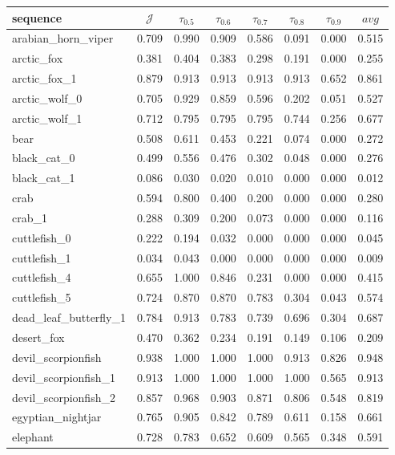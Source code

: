 \begin{table*}[]
\begin{tabular}{l|c|cccccc}
sequence & $\mathcal{J}$ & $\tau_{0.5}$ & $\tau_{0.6}$ & $\tau_{0.7}$ & $\tau_{0.8}$ & $\tau_{0.9}$ & $avg$ \\ \hline
arabian\_horn\_viper & 0.709 & 0.990 & 0.909 & 0.586 & 0.091 & 0.000 & 0.515 \\
arctic\_fox & 0.381 & 0.404 & 0.383 & 0.298 & 0.191 & 0.000 & 0.255 \\
arctic\_fox\_1 & 0.879 & 0.913 & 0.913 & 0.913 & 0.913 & 0.652 & 0.861 \\
arctic\_wolf\_0 & 0.705 & 0.929 & 0.859 & 0.596 & 0.202 & 0.051 & 0.527 \\ 
arctic\_wolf\_1 & 0.712 & 0.795 & 0.795 & 0.795 & 0.744 & 0.256 & 0.677 \\
bear & 0.508 & 0.611 & 0.453 & 0.221 & 0.074 & 0.000 & 0.272 \\
black\_cat\_0 & 0.499 & 0.556 & 0.476 & 0.302 & 0.048 & 0.000 & 0.276 \\
black\_cat\_1 & 0.086 & 0.030 & 0.020 & 0.010 & 0.000 & 0.000 & 0.012 \\
crab & 0.594 & 0.800 & 0.400 & 0.200 & 0.000 & 0.000 & 0.280 \\
crab\_1 & 0.288 & 0.309 & 0.200 & 0.073 & 0.000 & 0.000 & 0.116 \\
cuttlefish\_0 & 0.222 & 0.194 & 0.032 & 0.000 & 0.000 & 0.000 & 0.045 \\
cuttlefish\_1 & 0.034 & 0.043 & 0.000 & 0.000 & 0.000 & 0.000 & 0.009 \\
cuttlefish\_4 & 0.655 & 1.000 & 0.846 & 0.231 & 0.000 & 0.000 & 0.415 \\
cuttlefish\_5 & 0.724 & 0.870 & 0.870 & 0.783 & 0.304 & 0.043 & 0.574 \\
dead\_leaf\_butterfly\_1 & 0.784 & 0.913 & 0.783 & 0.739 & 0.696 & 0.304 & 0.687 \\
desert\_fox & 0.470 & 0.362 & 0.234 & 0.191 & 0.149 & 0.106 & 0.209 \\
devil\_scorpionfish & 0.938 & 1.000 & 1.000 & 1.000 & 0.913 & 0.826 & 0.948 \\
devil\_scorpionfish\_1 & 0.913 & 1.000 & 1.000 & 1.000 & 1.000 & 0.565 & 0.913 \\
devil\_scorpionfish\_2 & 0.857 & 0.968 & 0.903 & 0.871 & 0.806 & 0.548 & 0.819 \\
egyptian\_nightjar & 0.765 & 0.905 & 0.842 & 0.789 & 0.611 & 0.158 & 0.661 \\
elephant & 0.728 & 0.783 & 0.652 & 0.609 & 0.565 & 0.348 & 0.591 \\

\end{tabular}
\end{table*}
